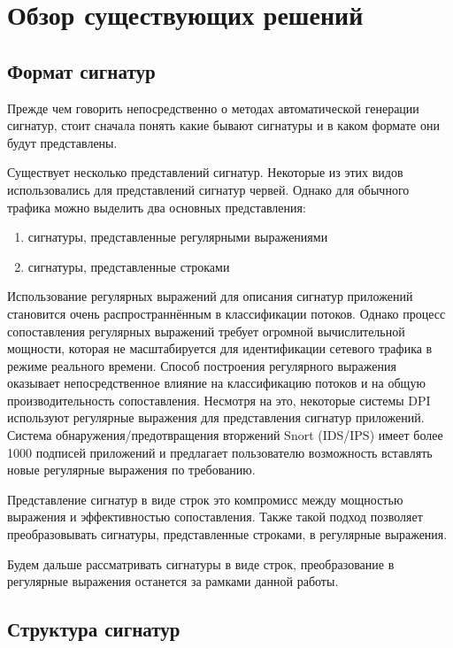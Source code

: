 \section{Обзор существующих решений}
\label{sec:Chapter2} 

\subsection{Формат сигнатур}

Прежде чем говорить непосредственно о методах автоматической генерации сигнатур, стоит сначала понять какие бывают сигнатуры и в каком формате они будут представлены.

Существует несколько представлений сигнатур. Некоторые из этих видов использовались для представлений сигнатур червей.
Однако для обычного трафика можно выделить два основных представления:

\begin{enumerate}
    \item сигнатуры, представленные регулярными выражениями
    \item сигнатуры, представленные строками
\end{enumerate}

Использование регулярных выражений для описания сигнатур приложений становится очень распространнённым в классификации потоков.
Однако процесс сопоставления регулярных выражений требует огромной вычислительной мощности, которая не масштабируется для идентификации сетевого трафика в режиме реального времени.
Способ построения регулярного выражения оказывает непосредственное влияние на классификацию потоков и на общую производительность сопоставления.
Несмотря на это, некоторые системы DPI используют регулярные выражения для представления сигнатур приложений. Система обнаружения/предотвращения вторжений Snort (IDS/IPS)
имеет более 1000 подписей приложений и предлагает пользователю возможность вставлять новые регулярные выражения по требованию.

Представление сигнатур в виде строк это компромисс между мощностью выражения и эффективностью сопоставления.
Также такой подход позволяет преобразовывать сигнатуры, представленные строками, в регулярные выражения.

Будем дальше рассматривать сигнатуры в виде строк, преобразование в регулярные выражения останется за рамками данной работы.

\subsection{Структура сигнатур}

